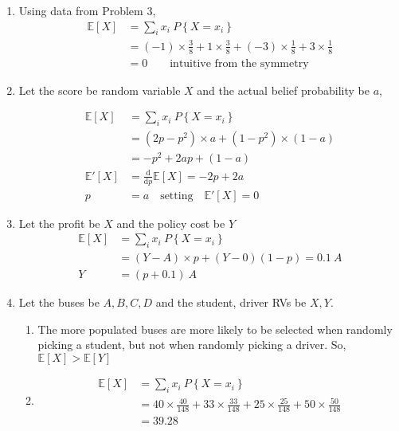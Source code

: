 \begin{enumerate}
	\item Using data from Problem 3,
	\begin{align}
		\mathbb{E}[X] &= \sum\limits_{i} x_i\ P \left\{ X = x_i \right\} \nonumber \\
		&= (-1) \times \frac{3}{8} + 1 \times \frac{3}{8} + (-3) \times \frac{1}{8} + 3 \times \frac{1}{8} \nonumber \\
		&= 0 \qquad \text{intuitive from the symmetry}
	\end{align}
	
	\item Let the score be random variable $ X $ and the actual belief probability be $ a $,
	
		\begin{align}
			\mathbb{E}[X] &= \sum\limits_{i} x_i\ P \left\{ X = x_i \right\} \nonumber \\
			&= (2p - p^2)	 \times a +  (1 - p^2) \times (1-a) \nonumber \\
			&= -p^2 + 2ap + (1-a) \nonumber \\
			\mathbb{E}'[X] &= \frac{\mathrm{d}}{\mathrm{d} p} \mathbb{E}[X] = -2p + 2a \\
			p &= a \quad \text{setting} \quad 	\mathbb{E}'[X] = 0
		\end{align}
	
	
	\item Let the profit be $ X $ and the policy cost be $ Y $\\
	
	
		\begin{align}
			\mathbb{E}[X] &= \sum\limits_{i} x_i\ P \left\{ X = x_i \right\} \nonumber \\
			&= (Y - A) \times p + (Y - 0)(1-p) = 0.1\ A\\
			Y &= (p + 0.1)\ A 
		\end{align}
	
	
	\item Let the buses be $ A, B, C, D $ and the student, driver RVs be $ X, Y $.
	
		\begin{enumerate}
			
			\item The more populated buses are more likely to be selected when randomly picking a student, but not when randomly picking a driver. So, $ \mathbb{E}[X] > \mathbb{E}[Y] $ \\
			
			
			\item \begin{align}
				\mathbb{E}[X] &= \sum\limits_{i} x_i\ P \left\{ X = x_i \right\} \nonumber \\
				&= 40 \times \frac{40}{148} + 33 \times \frac{33}{148} + 25 \times \frac{25}{148} + 50 \times \frac{50}{148}\\
				&= 39.28
			\end{align}
			

\end{enumerate}
\end{enumerate}
